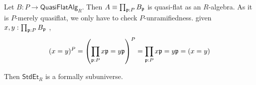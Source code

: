 \begin{example}
	Let $B : P \to \mathsf{QuasiFlatAlg}_R$. Then $A	\equiv  \prod_{\mathfrak{p} : P} B_{\mathfrak{p}}$ is quasi-flat as an $R$-algebra. As it is $P$-merely quasiflat, we only have to check $P$-unramifiedness. given $x , y :  \prod_{\mathfrak{p} : P} B_{\mathfrak{p}}$ , 
	\[(x = y)^P = \left(\prod_{\mathfrak{p} : P} x \mathfrak{p} = y \mathfrak{p} \right)^P = \prod_{\mathfrak{p} : P} x \mathfrak{p} = y \mathfrak{p} = (x = y)\]
\end{example}
\begin{lemma}{\label{lemma:StdEtSm}}
	Then $\mathsf{StdEt}_R$ is a formally \etale subuniverse. 
\end{lemma}

